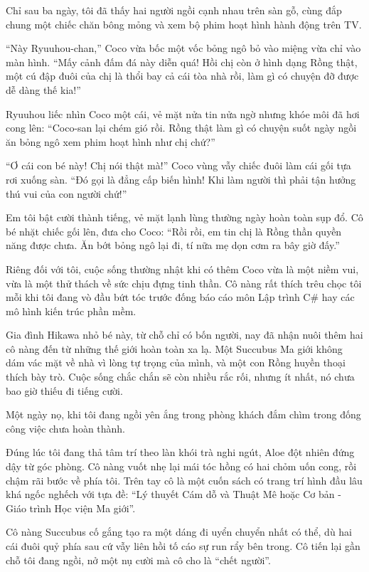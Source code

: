 \documentclass[../main.tex]{subfiles}
\begin{document}
Chỉ sau ba ngày, tôi đã thấy hai người ngồi cạnh nhau trên sàn gỗ, cùng đắp chung một chiếc chăn bông mỏng và xem bộ phim hoạt hình hành động trên TV.

``Này Ryuuhou-chan,'' Coco vừa bốc một vốc bỏng ngô bỏ vào miệng vừa chỉ vào màn hình. ``Mấy cảnh đấm đá này diễn quá! Hồi chị còn ở hình dạng Rồng thật, một cú đập đuôi của chị là thổi bay cả cái tòa nhà rồi, làm gì có chuyện đỡ được dễ dàng thế kia!''

Ryuuhou liếc nhìn Coco một cái, vẻ mặt nửa tin nửa ngờ nhưng khóe môi đã hơi cong lên: ``Coco-san lại chém gió rồi. Rồng thật làm gì có chuyện suốt ngày ngồi ăn bỏng ngô xem phim hoạt hình như chị chứ?''

``Ơ cái con bé này! Chị nói thật mà!'' Coco vùng vẫy chiếc đuôi làm cái gối tựa rơi xuống sàn. ``Đó gọi là đẳng cấp biến hình! Khi làm người thì phải tận hưởng thú vui của con người chứ!''

Em tôi bật cười thành tiếng, vẻ mặt lạnh lùng thường ngày hoàn toàn sụp đổ. Cô bé nhặt chiếc gối lên, đưa cho Coco: ``Rồi rồi, em tin chị là Rồng thần quyền năng được chưa. Ăn bớt bỏng ngô lại đi, tí nữa mẹ dọn cơm ra bây giờ đấy.''

Riêng đối với tôi, cuộc sống thường nhật khi có thêm Coco vừa là một niềm vui, vừa là một thử thách về sức chịu đựng tinh thần. Cô nàng rất thích trêu chọc tôi mỗi khi tôi đang vò đầu bứt tóc trước đống báo cáo môn Lập trình C\# hay các mô hình kiến trúc phần mềm.

Gia đình Hikawa nhỏ bé này, từ chỗ chỉ có bốn người, nay đã nhận nuôi thêm hai cô nàng đến từ những thế giới hoàn toàn xa lạ. Một Succubus Ma giới không dám vác mặt về nhà vì lòng tự trọng của mình, và một con Rồng huyền thoại thích bày trò. Cuộc sống chắc chắn sẽ còn nhiều rắc rối, nhưng ít nhất, nó chưa bao giờ thiếu đi tiếng cười.

\ct

Một ngày nọ, khi tôi đang ngồi yên ắng trong phòng khách đắm chìm trong đống công việc chưa hoàn thành.

Đúng lúc tôi đang thả tâm trí theo làn khói trà nghi ngút, Aloe đột nhiên đứng dậy từ góc phòng. Cô nàng vuốt nhẹ lại mái tóc hồng có hai chỏm uốn cong, rồi chậm rãi bước về phía tôi.  Trên tay cô là một cuốn sách có trang trí hình đầu lâu khá ngốc nghếch với tựa đề: ``Lý thuyết Cám dỗ và Thuật Mê hoặc Cơ bản - Giáo trình Học viện Ma giới''.

Cô nàng Succubus cố gắng tạo ra một dáng đi uyển chuyển nhất có thể, dù hai cái đuôi quỷ phía sau cứ vẫy liên hồi tố cáo sự run rẩy bên trong. Cô tiến lại gần chỗ tôi đang ngồi, nở một nụ cười mà cô cho là ``chết người''.
\end{document}
